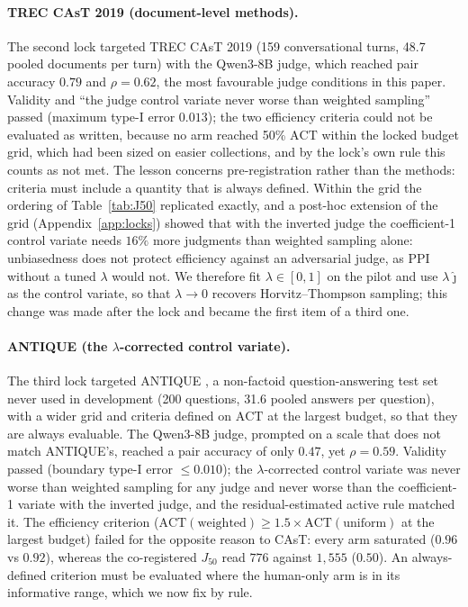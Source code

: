 \documentclass{article}
\newcommand{\ACT}{\mathrm{ACT}}
\newcommand{\Jfifty}{J_{50}}
\begin{document}
\paragraph{TREC CAsT 2019 (document-level methods).} The second lock targeted TREC CAsT 2019 \citep{dalton2020cast} (159 conversational turns, 48.7 pooled documents per turn) with the Qwen3-8B judge, which reached pair accuracy $0.79$ and $\rho=0.62$, the most favourable judge conditions in this paper. Validity and ``the judge control variate never worse than weighted sampling'' passed (maximum type-I error $0.013$); the two efficiency criteria could not be evaluated as written, because no arm reached 50\% $\ACT$ within the locked budget grid, which had been sized on easier collections, and by the lock's own rule this counts as not met. The lesson concerns pre-registration rather than the methods: criteria must include a quantity that is always defined. Within the grid the ordering of Table~\ref{tab:J50} replicated exactly, and a post-hoc extension of the grid (Appendix~\ref{app:locks}) showed that with the inverted judge the coefficient-1 control variate needs $16\%$ more judgments than weighted sampling alone: unbiasedness does not protect efficiency against an adversarial judge, as PPI without a tuned $\lambda$ would not. We therefore fit $\lambda\in[0,1]$ on the pilot and use $\lambda\hat\jmath$ as the control variate, so that $\lambda\to0$ recovers Horvitz--Thompson sampling; this change was made after the lock and became the first item of a third one.

\paragraph{ANTIQUE (the $\lambda$-corrected control variate).} The third lock targeted ANTIQUE \citep{hashemi2020antique}, a non-factoid question-answering test set never used in development (200 questions, 31.6 pooled answers per question), with a wider grid and criteria defined on $\ACT$ at the largest budget, so that they are always evaluable. The Qwen3-8B judge, prompted on a scale that does not match ANTIQUE's, reached a pair accuracy of only $0.47$, yet $\rho=0.59$. Validity passed (boundary type-I error $\le0.010$); the $\lambda$-corrected control variate was never worse than weighted sampling for any judge and never worse than the coefficient-1 variate with the inverted judge, and the residual-estimated active rule matched it. The efficiency criterion ($\ACT(\text{weighted})\ge1.5\times\ACT(\text{uniform})$ at the largest budget) failed for the opposite reason to CAsT: every arm saturated ($0.96$ vs $0.92$), whereas the co-registered $\Jfifty$ read $776$ against $1{,}555$ ($0.50$). An always-defined criterion must be evaluated where the human-only arm is in its informative range, which we now fix by rule.
\end{document}
